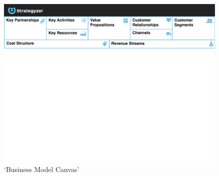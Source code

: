 		\begin{figure}[ht]
		    \begin{center}
			    \includegraphics[scale=0.6]{Talk11/bmc_blocks_only.pdf}
		    \end{center}
		    \caption{`Business Model Canvas'}
		    \label{fig:bmc}
		\end{figure}
